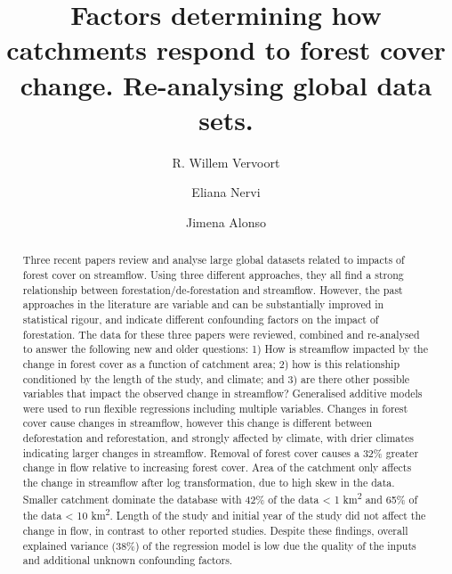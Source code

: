 \documentclass[]{elsarticle} %
\begin{document}
\begin{frontmatter}

  \title{Factors determining how catchments respond to forest cover change. Re-analysing global data sets.}
    \author[DARE]{R. Willem Vervoort}
    \author[INIA]{Eliana Nervi}
    \author[IMFIA]{Jimena Alonso}
      \address[DARE]{ARC Training Centre Data Analytics for Resources and Environments \& Sydney Institute of Agriculture, School of Life and Environmental Sciences.}
    \address[The University of Sydney]{The University of Sydney, Sydney, NSW 2006, Australia}
    \address[INIA]{Project Manager, FPTA 358, Instituto Nacional de Investigacion Agropecuaria, INIA-Uruguay, Ruta 48 km 10, Rincon del Colorado, 90100 Canelones, Uruguay}
    \address[IMFIA]{Institute of Fluid Mechanics and Environmental Engineering, School of Engineering, Universidad de la República, 11200 Montevideo, Uruguay}
  
  \begin{abstract}
  Three recent papers review and analyse large global datasets related to impacts of forest cover on streamflow. Using three different approaches, they all find a strong relationship between forestation/de-forestation and streamflow. However, the past approaches in the literature are variable and can be substantially improved in statistical rigour, and indicate different confounding factors on the impact of forestation. The data for these three papers were reviewed, combined and re-analysed to answer the following new and older questions: 1) How is streamflow impacted by the change in forest cover as a function of catchment area; 2) how is this relationship conditioned by the length of the study, and climate; and 3) are there other possible variables that impact the observed change in streamflow? Generalised additive models were used to run flexible regressions including multiple variables.
  Changes in forest cover cause changes in streamflow, however this change is different between deforestation and reforestation, and strongly affected by climate, with drier climates indicating larger changes in streamflow. Removal of forest cover causes a 32\% greater change in flow relative to increasing forest cover. Area of the catchment only affects the change in streamflow after log transformation, due to high skew in the data. Smaller catchment dominate the database with 42\% of the data \textless{} 1 km\textsuperscript{2} and 65\% of the data \textless{} 10 km\textsuperscript{2}. Length of the study and initial year of the study did not affect the change in flow, in contrast to other reported studies. Despite these findings, overall explained variance (38\%) of the regression model is low due the quality of the inputs and additional unknown confounding factors.
  \end{abstract}
  
 \end{frontmatter}
\end{document}
